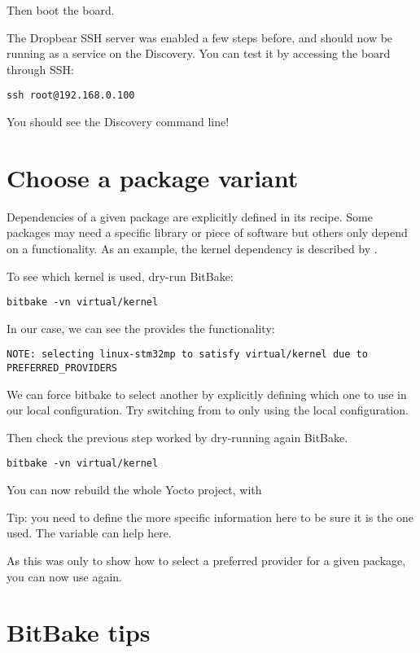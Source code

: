 Then boot the board.

The Dropbear SSH server was enabled a few steps before, and should now be
running as a service on the Discovery. You can test it by accessing the
board through SSH:
\begin{verbatim}
ssh root@192.168.0.100
\end{verbatim}

You should see the Discovery command line!

\section{Choose a package variant}

Dependencies of a given package are explicitly defined in its recipe.
Some packages may need a specific library or piece of software but
others only depend on a functionality. As an example, the kernel
dependency is described by .

To see which kernel is used, dry-run BitBake:
\begin{verbatim}
bitbake -vn virtual/kernel
\end{verbatim}

In our case, we can see the  provides the
 functionality:
\small
\begin{verbatim}
NOTE: selecting linux-stm32mp to satisfy virtual/kernel due to PREFERRED_PROVIDERS
\end{verbatim}
\normalsize

We can force bitbake to select another  by explicitly
defining which one to use in our local configuration. Try switching
from  to  only using the
local configuration.

Then check the previous step worked by dry-running again BitBake.
\begin{verbatim}
bitbake -vn virtual/kernel
\end{verbatim}

You can now rebuild the whole Yocto project, with 

Tip: you need to define the more specific information here to be sure it is the
one used. The  variable can help here.

As this was only to show how to select a preferred provider for a
given package, you can now use  again.

\section{BitBake tips}

